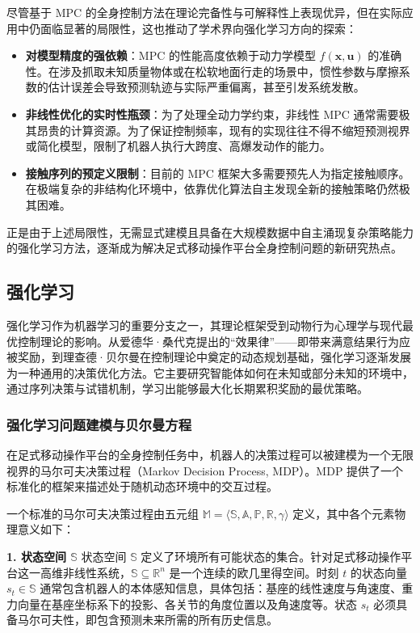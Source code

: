 尽管基于 MPC 的全身控制方法在理论完备性与可解释性上表现优异，但在实际应用中仍面临显著的局限性，这也推动了学术界向强化学习方向的探索：
\begin{itemize}
    \item \textbf{对模型精度的强依赖}：MPC 的性能高度依赖于动力学模型 $f(\mathbf{x}, \mathbf{u})$ 的准确性。在涉及抓取未知质量物体或在松软地面行走的场景中，惯性参数与摩擦系数的估计误差会导致预测轨迹与实际严重偏离，甚至引发系统发散。
    \item \textbf{非线性优化的实时性瓶颈}：为了处理全动力学约束，非线性 MPC 通常需要极其昂贵的计算资源。为了保证控制频率，现有的实现往往不得不缩短预测视界或简化模型，限制了机器人执行大跨度、高爆发动作的能力。
    \item \textbf{接触序列的预定义限制}：目前的 MPC 框架大多需要预先人为指定接触顺序。在极端复杂的非结构化环境中，依靠优化算法自主发现全新的接触策略仍然极其困难。
\end{itemize}
正是由于上述局限性，无需显式建模且具备在大规模数据中自主涌现复杂策略能力的强化学习方法，逐渐成为解决足式移动操作平台全身控制问题的新研究热点。

\subsection{强化学习}

强化学习\cite{Sutton1998}作为机器学习的重要分支之一，其理论框架受到动物行为心理学与现代最优控制理论的影响。从爱德华·桑代克提出的“效果律”——即带来满意结果行为应被奖励，到理查德·贝尔曼在控制理论中奠定的动态规划\cite{Bellman1954}基础，强化学习逐渐发展为一种通用的决策优化方法。它主要研究智能体如何在未知或部分未知的环境中，通过序列决策与试错机制，学习出能够最大化长期累积奖励的最优策略。

\subsubsection{强化学习问题建模与贝尔曼方程}

在足式移动操作平台的全身控制任务中，机器人的决策过程可以被建模为一个无限视界的马尔可夫决策过程（Markov Decision Process, MDP）。MDP 提供了一个标准化的框架来描述处于随机动态环境中的交互过程。

一个标准的马尔可夫决策过程由五元组 $\mathbb{M} = \langle \mathbb{S}, \mathbb{A}, \mathbb{P}, \mathbb{R}, \gamma \rangle$ 定义，其中各个元素物理意义如下：

\textbf{1. 状态空间 $\mathbb{S}$}
状态空间 $\mathbb{S}$ 定义了环境所有可能状态的集合。针对足式移动操作平台这一高维非线性系统，$\mathbb{S} \subseteq \mathbb{R}^n$ 是一个连续的欧几里得空间。时刻 $t$ 的状态向量 $s_t \in \mathbb{S}$ 通常包含机器人的本体感知信息，具体包括：基座的线性速度与角速度、重力向量在基座坐标系下的投影、各关节的角度位置以及角速度等。状态 $s_t$ 必须具备马尔可夫性，即包含预测未来所需的所有历史信息。

